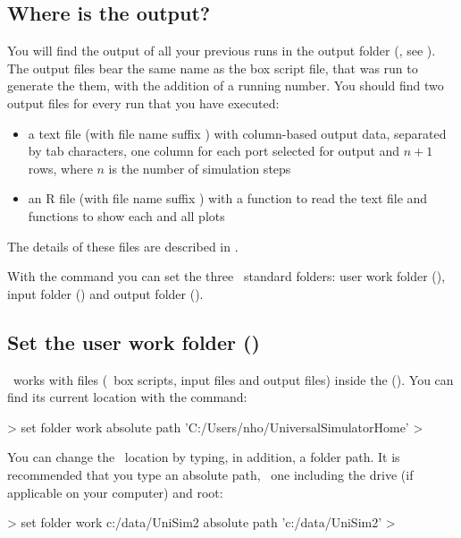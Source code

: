 \subsection{Where is the output?}
\label{ch:where-is-the-output}
You will find the output of all your previous runs in the output folder (\outputfolder, see ). The output files bear the same name as the box script file, that was run to generate the them, with the addition of a running number. You should find two output files for every run that you have executed:
\begin{itemize}
\item a text file (with file name suffix ) with column-based output data, separated by tab characters, one column for each port selected for output and $n+1$ rows, where $n$ is the number of simulation steps
\item an R file (with file name suffix ) with a function to read the text file and functions to show each and all plots
\end{itemize}
The details of these files are described in .



With the  command you can set the three \US\ standard folders: user work folder (\ushome), input folder () and output folder (\outputfolder).

\subsection{Set the user work folder (\ushome)}
\US\ works with files (\eg\ box scripts, input files and output files) inside the  (\ushome). You can find its current location with the  command:

\begin{usdialog}
> set folder work
absolute path 'C:/Users/nho/UniversalSimulatorHome'
> 
\end{usdialog}

You can change the \ushome\ location by typing, in addition, a folder path. It is recommended that you type an absolute path, \ie\ one including the drive (if applicable on your computer) and root:

\begin{usdialog}
> set folder work c:/data/UniSim2
absolute path 'c:/data/UniSim2'
> 
\end{usdialog}

